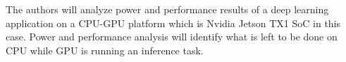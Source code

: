 The authors will analyze power and performance results of a deep learning application on a CPU-GPU platform which is Nvidia Jetson TX1 SoC in this case. Power and performance analysis will identify what is left to be done on CPU while GPU is running an inference task.